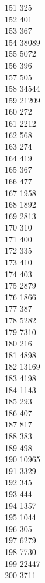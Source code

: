 { 151	325 \\
 152	401 \\
 153	367 \\
 154	38089 \\
 155	5072 \\
 156	396 \\
 157	505 \\
 158	34544 \\
 159	21209 \\
 160	272 \\
 161	2212 \\
 162	568 \\
 163	274 \\
 164	419 \\
 165	367 \\
 166	477 \\
 167	1958 \\
 168	1892 \\
 169	2813 \\
 170	310 \\
 171	400 \\
 172	335 \\
 173	410 \\
 174	403 \\
 175	2879 \\
 176	1866 \\
 177	387 \\
 178	5282 \\
 179	7310 \\
 180	216 \\
 181	4898 \\
 182	13169 \\
 183	4198 \\
 184	1143 \\
 185	293 \\
 186	407 \\
 187	817 \\
 188	383 \\
 189	498 \\
 190	10965 \\
 191	3329 \\
 192	345 \\
 193	444 \\
 194	1357 \\
 195	1044 \\
 196	305 \\
 197	6279 \\
 198	7730 \\
 199	22447 \\
 200	3711 \\
}
